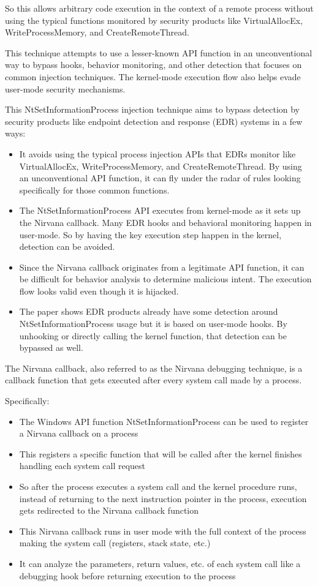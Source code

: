 \documentclass{article}
\begin{document}
So this allows arbitrary code execution in the context of a remote process without using the typical functions monitored by security products like VirtualAllocEx, WriteProcessMemory, and CreateRemoteThread.

This technique attempts to use a lesser-known API function in an unconventional way to bypass hooks, behavior monitoring, and other detection that focuses on common injection techniques. The kernel-mode execution flow also helps evade user-mode security mechanisms.

This NtSetInformationProcess injection technique aims to bypass detection by security products like endpoint detection and response (EDR) systems in a few ways:

\begin{itemize}
\item It avoids using the typical process injection APIs that EDRs monitor like VirtualAllocEx, WriteProcessMemory, and CreateRemoteThread. By using an unconventional API function, it can fly under the radar of rules looking specifically for those common functions.
\item The NtSetInformationProcess API executes from kernel-mode as it sets up the Nirvana callback. Many EDR hooks and behavioral monitoring happen in user-mode. So by having the key execution step happen in the kernel, detection can be avoided.
\item Since the Nirvana callback originates from a legitimate API function, it can be difficult for behavior analysis to determine malicious intent. The execution flow looks valid even though it is hijacked.
\item The paper shows EDR products already have some detection around NtSetInformationProcess usage but it is based on user-mode hooks. By unhooking or directly calling the kernel function, that detection can be bypassed as well.
\end{itemize}

The Nirvana callback, also referred to as the Nirvana debugging technique, is a callback function that gets executed after every system call made by a process.

Specifically:
\begin{itemize}
\item The Windows API function NtSetInformationProcess can be used to register a Nirvana callback on a process
\item This registers a specific function that will be called after the kernel finishes handling each system call request
\item So after the process executes a system call and the kernel procedure runs, instead of returning to the next instruction pointer in the process, execution gets redirected to the Nirvana callback function
\item This Nirvana callback runs in user mode with the full context of the process making the system call (registers, stack state, etc.)
\item It can analyze the parameters, return values, etc. of each system call like a debugging hook before returning execution to the process
\end{itemize}
  
\end{document}
